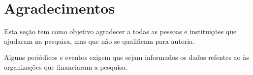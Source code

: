 \documentclass[12pt]{article}
\begin{document}
\section*{Agradecimentos} \label{sec:agradecimentos}

Esta seção tem como objetivo agradecer a todas as pessoas e instituições que ajudaram na pesquisa, mas que não se qualificam para autoria.

Alguns periódicos e eventos exigem que sejam informados os dados refentes ao às organizações que financiaram a pesquisa.









\end{document}
